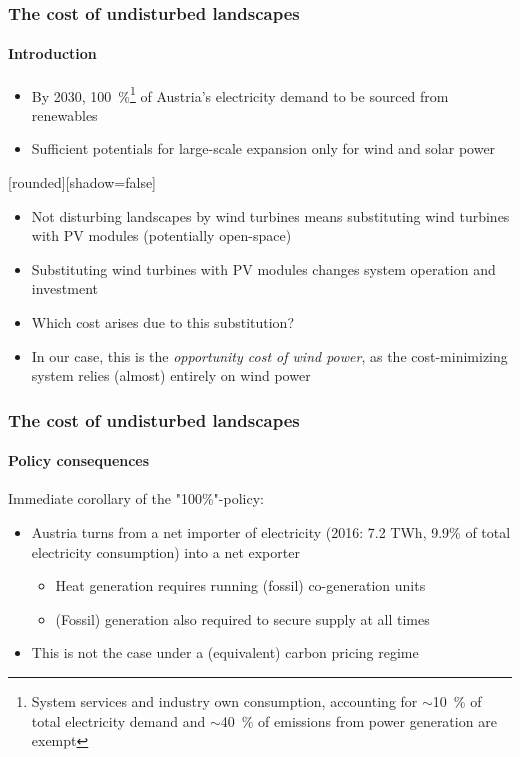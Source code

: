\documentclass[aspectratio=1610, xcolor=dvipsnames]{beamer}
\begin{document}
    \begin{frame}
        \frametitle{The cost of undisturbed landscapes}
        \framesubtitle{Introduction}
        \begin{itemize}
            \item By 2030, \SI{100}{\percent}\footnote[frame]{System services and industry own consumption,
                accounting for $\sim$\SI{10}{\percent} of total electricity demand and $\sim$\SI{40}{\percent} of  emissions from power
                generation are exempt} of Austria's electricity demand to be sourced from renewables
            \item Sufficient potentials for large-scale expansion only for wind and solar power
        \end{itemize}
        \medskip
        {%
            [rounded][shadow=false]
            \begin{block}{}
                \begin{itemize}
                    \item Not disturbing landscapes by wind turbines means substituting wind turbines with PV modules (potentially open-space)
                \end{itemize}
            \end{block}
        }%
        \medskip
        \begin{itemize}
            \item Substituting wind turbines with PV modules changes system operation and investment
            \item Which cost arises due to this substitution?
            \item In our case, this is the \emph{opportunity cost of wind power}, as the cost-minimizing system relies
            (almost) entirely on wind power
        \end{itemize}
    \end{frame}

    \begin{frame}
        \frametitle{The cost of undisturbed landscapes}
        \framesubtitle{Policy consequences}
        Immediate corollary of the "100\%"-policy:
        \begin{itemize}
            \item  Austria turns from a net importer of electricity (2016: 7.2 TWh, 9.9\% of total electricity
            consumption) into a net exporter
            \begin{itemize}
                \item Heat generation requires running (fossil) co-generation units
                \item (Fossil) generation also required to secure supply at all times
            \end{itemize}
            \item This is not the case under a (equivalent) carbon pricing regime
        \end{itemize}
    \end{frame}
\end{document}
